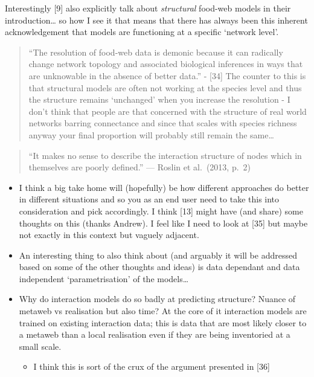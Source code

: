 \documentclass[
]{article}
\providecommand{\tightlist}{%
  \setlength{\itemsep}{0pt}\setlength{\parskip}{0pt}}\usepackage{longtable,booktabs,array}
\begin{document}
Interestingly {[}9{]} also explicitly talk about \emph{structural}
food-web models in their introduction\ldots{} so how I see it that means
that there has always been this inherent acknowledgement that models are
functioning at a specific `network level'.

\begin{quote}
``The resolution of food-web data is demonic because it can radically
change network topology and associated biological inferences in ways
that are unknowable in the absence of better data.'' - {[}34{]} The
counter to this is that structural models are often not working at the
species level and thus the structure remains `unchanged' when you
increase the resolution - I don't think that people are that concerned
with the structure of real world networks barring connectance and since
that scales with species richness anyway your final proportion will
probably still remain the same\ldots{}
\end{quote}

\begin{quote}
``It makes no sense to describe the interaction structure of nodes which
in themselves are poorly defined.'' --- Roslin et al.~(2013, p.~2)
\end{quote}

\begin{itemize}
\item
  I think a big take home will (hopefully) be how different approaches
  do better in different situations and so you as an end user need to
  take this into consideration and pick accordingly. I think {[}13{]}
  might have (and share) some thoughts on this (thanks Andrew). I feel
  like I need to look at {[}35{]} but maybe not exactly in this context
  but vaguely adjacent.
\item
  An interesting thing to also think about (and arguably it will be
  addressed based on some of the other thoughts and ideas) is data
  dependant and data independent `parametrisation' of the models\ldots{}
\item
  Why do interaction models do so badly at predicting structure? Nuance
  of metaweb vs realisation but also time? At the core of it interaction
  models are trained on existing interaction data; this is data that are
  most likely closer to a metaweb than a local realisation even if they
  are being inventoried at a small scale.

  \begin{itemize}
  \tightlist
  \item
    I think this is sort of the crux of the argument presented in
    {[}36{]}
  \end{itemize}
\end{itemize}
\end{document}

